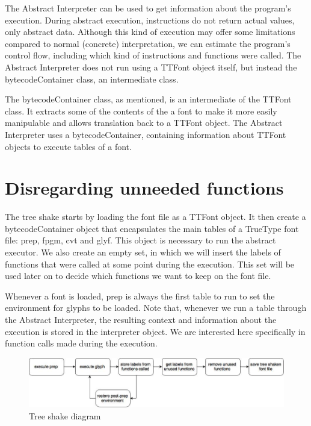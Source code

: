 \documentclass[12pt]{article}
\begin{document}
The Abstract Interpreter can be used to get information about the
program's execution. During abstract execution, instructions do not
return actual values, only abstract data. Although this kind of
execution may offer some limitations compared to normal (concrete)
interpretation, we can estimate  the program's control flow, including
which kind of instructions and functions were called. The Abstract
Interpreter does not run using a TTFont object itself, but instead the
bytecodeContainer class, an intermediate class.

The bytecodeContainer class, as mentioned, is an intermediate of
the TTFont class. It extracts some of the contents of the a font to make
it more easily manipulable and allows translation back to a TTFont
object. The Abstract Interpreter uses a bytecodeContainer, containing 
information about TTFont objects to execute tables of a font.

\section{Disregarding unneeded functions}

The tree shake starts by loading the font file as a TTFont object.
It then create a bytecodeContainer object that encapsulates the main
tables of a TrueType font file: prep, fpgm, cvt and glyf. This object 
is necessary to run the abstract executor. We also create an empty set, 
in which we will insert the labels of functions that were called at some 
point during the execution. This set will be used later on to decide 
which functions we want to keep on the font file.

Whenever a font is loaded, prep is always the first table to run to 
set the environment for glyphs to be loaded. Note that, whenever we run
a table through the Abstract Interpreter, the resulting context
and information about the execution is stored in the interpreter object.
We are interested here specifically in function calls made during the execution.

\begin{figure}[ht!]
\centering
\includegraphics[width=180mm]{diagram.jpg}
\caption{Tree shake diagram \label{overflow}}
\end{figure}
\end{document}
